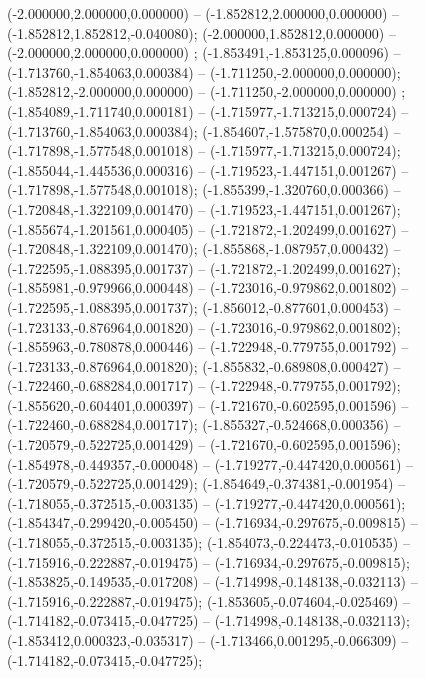  (-2.000000,2.000000,0.000000) -- (-1.852812,2.000000,0.000000) -- (-1.852812,1.852812,-0.040080);
 (-2.000000,1.852812,0.000000) -- (-2.000000,2.000000,0.000000) ;
 (-1.853491,-1.853125,0.000096) -- (-1.713760,-1.854063,0.000384) -- (-1.711250,-2.000000,0.000000);
 (-1.852812,-2.000000,0.000000) -- (-1.711250,-2.000000,0.000000) ;
 (-1.854089,-1.711740,0.000181) -- (-1.715977,-1.713215,0.000724) -- (-1.713760,-1.854063,0.000384);
 (-1.854607,-1.575870,0.000254) -- (-1.717898,-1.577548,0.001018) -- (-1.715977,-1.713215,0.000724);
 (-1.855044,-1.445536,0.000316) -- (-1.719523,-1.447151,0.001267) -- (-1.717898,-1.577548,0.001018);
 (-1.855399,-1.320760,0.000366) -- (-1.720848,-1.322109,0.001470) -- (-1.719523,-1.447151,0.001267);
 (-1.855674,-1.201561,0.000405) -- (-1.721872,-1.202499,0.001627) -- (-1.720848,-1.322109,0.001470);
 (-1.855868,-1.087957,0.000432) -- (-1.722595,-1.088395,0.001737) -- (-1.721872,-1.202499,0.001627);
 (-1.855981,-0.979966,0.000448) -- (-1.723016,-0.979862,0.001802) -- (-1.722595,-1.088395,0.001737);
 (-1.856012,-0.877601,0.000453) -- (-1.723133,-0.876964,0.001820) -- (-1.723016,-0.979862,0.001802);
 (-1.855963,-0.780878,0.000446) -- (-1.722948,-0.779755,0.001792) -- (-1.723133,-0.876964,0.001820);
 (-1.855832,-0.689808,0.000427) -- (-1.722460,-0.688284,0.001717) -- (-1.722948,-0.779755,0.001792);
 (-1.855620,-0.604401,0.000397) -- (-1.721670,-0.602595,0.001596) -- (-1.722460,-0.688284,0.001717);
 (-1.855327,-0.524668,0.000356) -- (-1.720579,-0.522725,0.001429) -- (-1.721670,-0.602595,0.001596);
 (-1.854978,-0.449357,-0.000048) -- (-1.719277,-0.447420,0.000561) -- (-1.720579,-0.522725,0.001429);
 (-1.854649,-0.374381,-0.001954) -- (-1.718055,-0.372515,-0.003135) -- (-1.719277,-0.447420,0.000561);
 (-1.854347,-0.299420,-0.005450) -- (-1.716934,-0.297675,-0.009815) -- (-1.718055,-0.372515,-0.003135);
 (-1.854073,-0.224473,-0.010535) -- (-1.715916,-0.222887,-0.019475) -- (-1.716934,-0.297675,-0.009815);
 (-1.853825,-0.149535,-0.017208) -- (-1.714998,-0.148138,-0.032113) -- (-1.715916,-0.222887,-0.019475);
 (-1.853605,-0.074604,-0.025469) -- (-1.714182,-0.073415,-0.047725) -- (-1.714998,-0.148138,-0.032113);
 (-1.853412,0.000323,-0.035317) -- (-1.713466,0.001295,-0.066309) -- (-1.714182,-0.073415,-0.047725);
